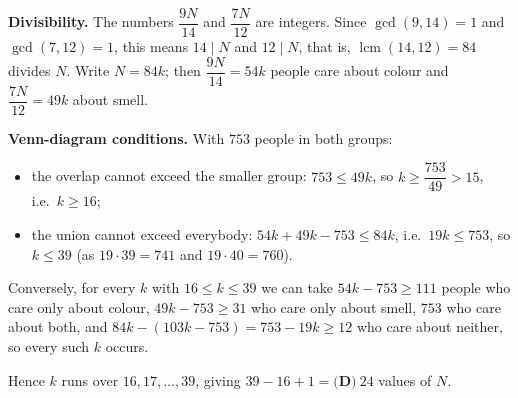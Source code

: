 \textbf{Divisibility.} The numbers $\dfrac{9N}{14}$ and $\dfrac{7N}{12}$ are integers. Since $\gcd(9,14)=1$ and $\gcd(7,12)=1$, this means $14\mid N$ and $12\mid N$, that is, $\operatorname{lcm}(14,12)=84$ divides $N$. Write $N=84k$; then $\dfrac{9N}{14}=54k$ people care about colour and $\dfrac{7N}{12}=49k$ about smell.

\textbf{Venn-diagram conditions.} With $753$ people in both groups:
\begin{itemize}
\item the overlap cannot exceed the smaller group: $753\le49k$, so $k\ge\dfrac{753}{49}>15$, i.e.\ $k\ge16$;
\item the union cannot exceed everybody: $54k+49k-753\le84k$, i.e.\ $19k\le753$, so $k\le39$ (as $19\cdot39=741$ and $19\cdot40=760$).
\end{itemize}
Conversely, for every $k$ with $16\le k\le39$ we can take $54k-753\ge111$ people who care only about colour, $49k-753\ge31$ who care only about smell, $753$ who care about both, and $84k-(103k-753)=753-19k\ge12$ who care about neither, so every such $k$ occurs.

Hence $k$ runs over $16,17,\dots,39$, giving $39-16+1=\boxed{\textbf{(D)}\ 24}$ values of $N$.
